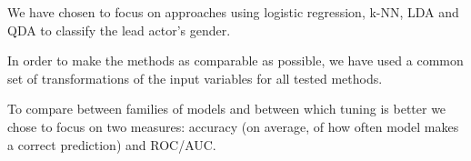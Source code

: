 \documentclass[../../project.tex]{subfiles}
\begin{document}
	We have chosen to focus on approaches using logistic regression, k-NN, LDA and QDA to classify the lead actor's gender.
	
	In order to make the methods as comparable as possible, we have used a common set of transformations of the input variables for all tested methods.
	
	To compare between families of models and between which tuning is better we chose to focus on two measures: accuracy (on average, of how often model makes a correct prediction) and ROC/AUC.
\end{document}
